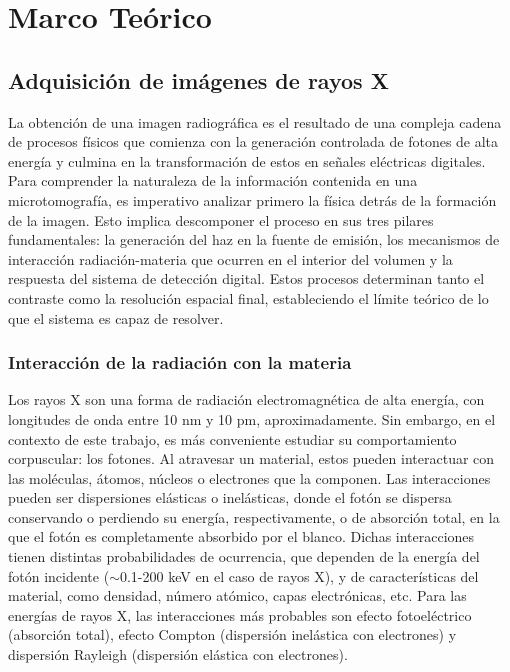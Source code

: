 \chapter{Marco Teórico}
\label{teorico}

\section{Adquisición de imágenes de rayos X}

La obtención de una imagen radiográfica es el resultado de una compleja cadena de procesos
físicos que comienza con la generación controlada de fotones de alta energía y culmina en la
transformación de estos en señales eléctricas digitales. Para comprender la naturaleza de la
información contenida en una microtomografía, es imperativo analizar primero la física detrás
de la formación de la imagen. Esto implica descomponer el proceso en sus tres pilares fundamentales:
la generación del haz en la fuente de emisión, los mecanismos de interacción radiación-materia
que ocurren en el interior del volumen y la respuesta del sistema de detección digital. Estos
procesos determinan tanto el contraste como la resolución espacial final, estableciendo el
límite teórico de lo que el sistema es capaz de resolver.


\subsection{Interacción de la radiación con la materia}

Los rayos X son una forma de radiación electromagnética de alta energía, con
longitudes de onda entre 10 nm y 10 pm, aproximadamente. Sin embargo, en el 
contexto de este trabajo, es más conveniente 
estudiar su comportamiento corpuscular: los fotones. Al atravesar un material,
estos pueden interactuar con las moléculas, átomos, núcleos o electrones que la
componen. Las interacciones pueden ser dispersiones elásticas o inelásticas,
donde el fotón se dispersa conservando o perdiendo su energía, respectivamente, o
de absorción total, en la que el fotón es completamente absorbido por el blanco.
Dichas interacciones tienen distintas probabilidades de ocurrencia, que dependen
de la energía del fotón incidente ($\sim$0.1-200 keV en el caso de rayos X), y de
características del material, como densidad, número atómico, capas electrónicas,
etc. Para las energías de rayos X, las interacciones más probables son efecto fotoeléctrico (absorción total),
efecto Compton (dispersión inelástica con electrones) y dispersión Rayleigh
(dispersión elástica con electrones). \cite{Als-Nielsen2011}

